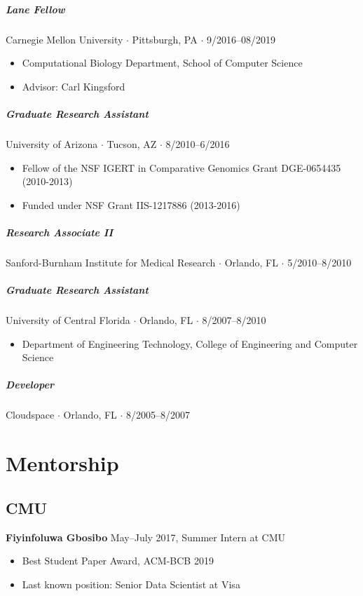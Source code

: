 \documentclass[10pt,letterpaper]{article}
\newcommand{\bigdot}{$\cdot$\xspace}
\begin{document}
\subparagraph{Lane Fellow}
Carnegie Mellon University \bigdot Pittsburgh, PA \bigdot 9/2016--08/2019
\begin{itemize}
    \item Computational Biology Department, School of Computer Science
    \item Advisor: Carl Kingsford
\end{itemize}

\subparagraph{Graduate Research Assistant}
University of Arizona \bigdot Tucson, AZ \bigdot 8/2010--6/2016 
\begin{itemize}
    \item Fellow of the NSF IGERT in Comparative Genomics Grant DGE-0654435 (2010-2013)
    \item Funded under NSF Grant IIS-1217886 (2013-2016)
\end{itemize}

\subparagraph{Research Associate II}
Sanford-Burnham Institute for Medical Research \bigdot Orlando, FL \bigdot 5/2010--8/2010 

\subparagraph{Graduate Research Assistant}
University of Central Florida \bigdot Orlando, FL \bigdot 8/2007--8/2010 
\begin{itemize}
    \item Department of Engineering Technology, College of Engineering and Computer Science
\end{itemize}

\subparagraph{Developer}
Cloudspace \bigdot Orlando, FL \bigdot 8/2005--8/2007 


\section*{Mentorship}
\subsection*{CMU}
\hspace{1.5em}\textbf{Fiyinfoluwa Gbosibo} May--July 2017, Summer Intern at CMU
\begin{itemize}
\item Best Student Paper Award, ACM-BCB 2019
\item Last known position: Senior Data Scientist at Visa
\end{itemize}
\end{document}
